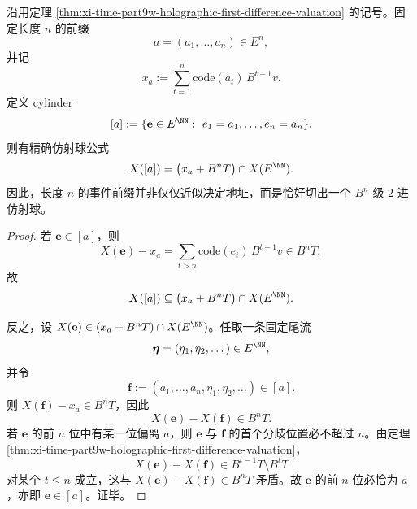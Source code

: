 \begin{corollary}[前缀柱集在全息像中的仿射球等式]\label{cor:xi-time-part9w-cylinder-affine-ball-identity}
沿用定理 \ref{thm:xi-time-part9w-holographic-first-difference-valuation} 的记号。固定长度 \(n\) 的前缀
\[
a=(a_1,\dots,a_n)\in E^n,
\]
并记
\[
x_a:=\sum_{t=1}^{n}\mathrm{code}(a_t)\,B^{t-1}v.
\]
定义 cylinder
\[
[a]
:=
\{\mathbf e\in E^{\NN}:\ e_1=a_1,\dots,e_n=a_n\}.
\]
则有精确仿射球公式
\[
X([a])
=
\bigl(x_a+B^nT\bigr)\cap X(E^{\NN}).
\]
因此，长度 \(n\) 的事件前缀并非仅仅近似决定地址，而是恰好切出一个 \(B^n\)-级 \(2\)-进仿射球。
\end{corollary}
\begin{proof}
若 \(\mathbf e\in[a]\)，则
\[
X(\mathbf e)-x_a
=
\sum_{t>n}\mathrm{code}(e_t)\,B^{t-1}v
\in B^nT,
\]
故
\[
X([a])\subseteq \bigl(x_a+B^nT\bigr)\cap X(E^{\NN}).
\]

反之，设 \(X(\mathbf e)\in (x_a+B^nT)\cap X(E^{\NN})\)。任取一条固定尾流
\[
\boldsymbol\eta=(\eta_1,\eta_2,\dots)\in E^{\NN},
\]
并令
\[
\mathbf f:=(a_1,\dots,a_n,\eta_1,\eta_2,\dots)\in[a].
\]
则 \(X(\mathbf f)-x_a\in B^nT\)，因此
\[
X(\mathbf e)-X(\mathbf f)\in B^nT.
\]
若 \(\mathbf e\) 的前 \(n\) 位中有某一位偏离 \(a\)，则 \(\mathbf e\) 与 \(\mathbf f\) 的首个分歧位置必不超过 \(n\)。由定理
\ref{thm:xi-time-part9w-holographic-first-difference-valuation}，
\[
X(\mathbf e)-X(\mathbf f)\in B^{t-1}T\setminus B^tT
\]
对某个 \(t\le n\) 成立，这与 \(X(\mathbf e)-X(\mathbf f)\in B^nT\) 矛盾。故 \(\mathbf e\) 的前 \(n\) 位必恰为 \(a\)，亦即 \(\mathbf e\in[a]\)。证毕。
\end{proof}


